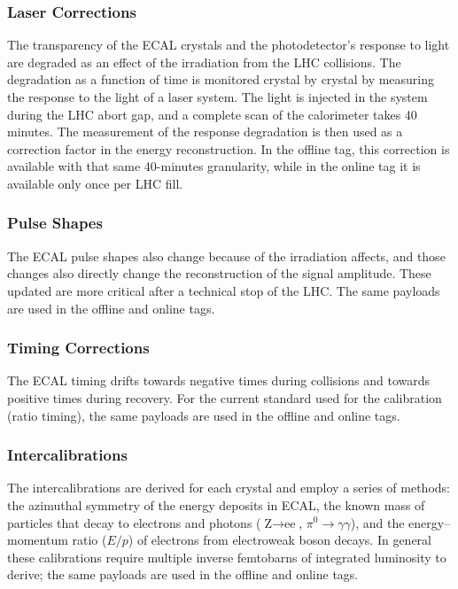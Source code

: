 \subsubsection{Laser Corrections}


The transparency of the ECAL crystals and the photodetector's response to light are degraded as an effect of the irradiation from the LHC collisions.
The degradation as a function of time is monitored crystal by crystal by measuring the response to the light of a laser system.
The light is injected in the system during the LHC abort gap, and a complete scan of the calorimeter takes 40 minutes.
The measurement of the response degradation is then used as a correction factor in the energy reconstruction.
In the offline tag, this correction is available with that same 40-minutes granularity,
while in the online tag it is available only once per LHC fill.

\subsubsection{Pulse Shapes}


The ECAL pulse shapes also change because of the irradiation affects,
and those changes also directly change the reconstruction of the signal amplitude.
These updated are more critical after a technical stop of the LHC.
The same payloads are used in the offline and online tags.

\subsubsection{Timing Corrections}


The ECAL timing drifts 
towards negative times during collisions 
and
towards positive times during recovery.
For the current standard used for the calibration (ratio timing), 
the same payloads are used in the offline and online tags.

\subsubsection{Intercalibrations}


The intercalibrations are derived for each crystal and employ a series of methods:
the azimuthal symmetry of the energy deposits in ECAL,
the known mass of particles that decay to electrons and photons
($\text{Z}\to\text{ee}$, $\pi^0\to\gamma\gamma$),
and
the energy--momentum ratio ($E/p$) of electrons from electroweak boson decays.
In general these calibrations require multiple inverse femtobarns of integrated luminosity to derive;
the same payloads are used in the offline and online tags.


